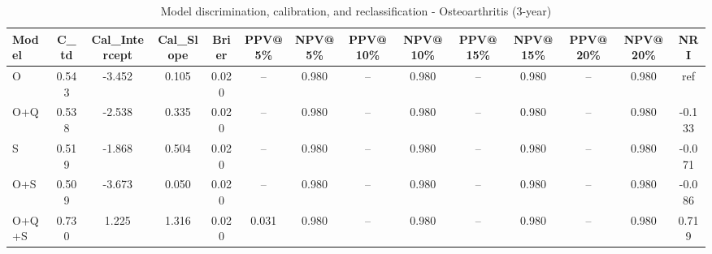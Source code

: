 \begin{table}[htbp]
\centering
\small
\caption{Model discrimination, calibration, and reclassification - Osteoarthritis (3-year)}
\label{tab:perf_osteoarthritis_3y}
\begin{tabular}{lccccccccccccc}
\toprule
Model & C\_td & Cal\_Intercept & Cal\_Slope & Brier & PPV@5\% & NPV@5\% & PPV@10\% & NPV@10\% & PPV@15\% & NPV@15\% & PPV@20\% & NPV@20\% & NRI \\
\midrule
O & 0.543 & -3.452 & 0.105 & 0.020 & -- & 0.980 & -- & 0.980 & -- & 0.980 & -- & 0.980 & ref \\
O+Q & 0.538 & -2.538 & 0.335 & 0.020 & -- & 0.980 & -- & 0.980 & -- & 0.980 & -- & 0.980 & -0.133 \\
S & 0.519 & -1.868 & 0.504 & 0.020 & -- & 0.980 & -- & 0.980 & -- & 0.980 & -- & 0.980 & -0.071 \\
O+S & 0.509 & -3.673 & 0.050 & 0.020 & -- & 0.980 & -- & 0.980 & -- & 0.980 & -- & 0.980 & -0.086 \\
O+Q+S & 0.730 & 1.225 & 1.316 & 0.020 & 0.031 & 0.980 & -- & 0.980 & -- & 0.980 & -- & 0.980 & 0.719 \\
\bottomrule
\end{tabular}
\end{table}